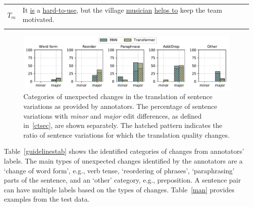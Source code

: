\begin{table}[htbp!]
\begin{small}
\begin{center}
\begin{tabularx}{\textwidth}{lX}
${T_m}$  & It \underline{is} a \underline{hard-to-use}, but the village \underline{musician} \underline{helps to} keep the team motivated.	\\ %
  \rowcolor{tablegray}   \multicolumn {2}{l}{\textcolor{mygray}{\texttt{$\Delta Translation$: [word form] [other] | $\Delta Quality$: Yes }}}  \\
\bottomrule
\end{tabularx}
 \end{center}
 \end{small}
\end{table}
%
%
  \begin{figure}[htb!]
\centering
\includegraphics[width=1\textwidth]{07-research-05/figs/plot3.pdf}
\caption{Categories of unexpected changes in the translation of sentence variations as provided by annotators. The percentage of sentence variations with \textit{minor} and \textit{major} edit differences, as defined in~\ref{ctsec}, are shown separately. The hatched pattern indicates the ratio of sentence variations for which the translation quality changes.} %
\label{fig2}
\end{figure}
%

Table~\ref{guidelinestab} shows the identified categories of changes from annotators' labels.  
The main types of unexpected changes identified by the annotators are a `change of word form', e.g., verb tense, `reordering of phrases', `paraphrasing' parts of the sentence, and an `other' category, e.g., preposition.  
A sentence pair can have multiple labels based on the types of changes. 
Table~\ref{man} provides examples from the test data. %

